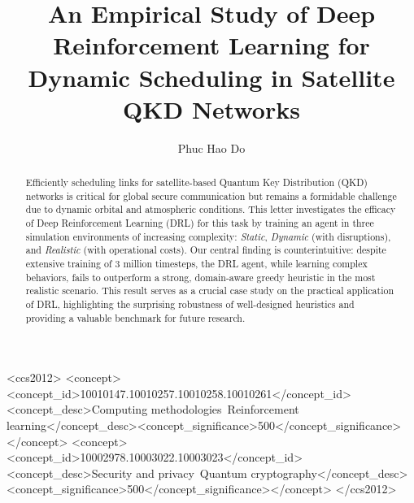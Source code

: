 \documentclass[manuscript, review, nonacm]{acmart}
\begin{document}
\title{An Empirical Study of Deep Reinforcement Learning for Dynamic Scheduling in Satellite QKD Networks}

\author{Phuc Hao Do}

\begin{abstract}
Efficiently scheduling links for satellite-based Quantum Key Distribution (QKD) networks is critical for global secure communication but remains a formidable challenge due to dynamic orbital and atmospheric conditions. This letter investigates the efficacy of Deep Reinforcement Learning (DRL) for this task by training an agent in three simulation environments of increasing complexity: \textit{Static}, \textit{Dynamic} (with disruptions), and \textit{Realistic} (with operational costs). Our central finding is counterintuitive: despite extensive training of 3 million timesteps, the DRL agent, while learning complex behaviors, fails to outperform a strong, domain-aware greedy heuristic in the most realistic scenario. This result serves as a crucial case study on the practical application of DRL, highlighting the surprising robustness of well-designed heuristics and providing a valuable benchmark for future research.
\end{abstract}

\begin{CCSXML}
<ccs2012>
   <concept><concept_id>10010147.10010257.10010258.10010261</concept_id><concept_desc>Computing methodologies~Reinforcement learning</concept_desc><concept_significance>500</concept_significance></concept>
   <concept><concept_id>10002978.10003022.10003023</concept_id><concept_desc>Security and privacy~Quantum cryptography</concept_desc><concept_significance>500</concept_significance></concept>
</ccs2012>
\end{CCSXML}

\maketitle
\end{document}
